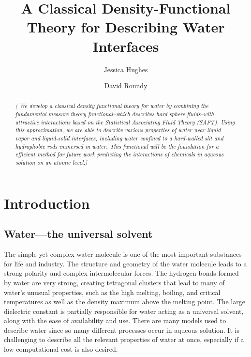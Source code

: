 \documentclass[letterpaper,twocolumn,amsmath,amssymb,prb]{revtex4-1}
\newcommand{\needsworklater}[1]{\emph{[#1]}}
\begin{document}
\title{A Classical Density-Functional Theory for Describing Water Interfaces}

\author{Jessica Hughes}

\author{David Roundy}

\begin{abstract}
\needsworklater{ We develop a classical density functional theory for
  water by combining the fundamental-measure theory functional--which
  describes hard sphere fluids--with attractive interactions based on the 
  Statistical Associating Fluid Theory (SAFT).  Using
  this approximation, we are able to describe various properties of
  water near liquid-vapor and liquid-solid interfaces, including water confined 
  to a hard-walled slit and hydrophobic rods immersed in water.  This
functional 
  will be the foundation for a efficient method for future work
  predicting the interactions of chemicals in aqueous solution on an
  atomic level.}

\tableofcontents
\end{abstract}

\maketitle

\section{Introduction}

\subsection{Water---the universal solvent}

The simple yet complex water molecule is one of the most important 
substances for life and industry. The structure and geometry of the 
water molecule leads to a strong polarity and complex intermolecular
forces. The hydrogen bonds formed by water are very strong, creating
tetragonal clusters that lead to many of water's unusual properties,
such as the high melting, boiling, and critical temperatures as well as the
density maximum above the melting point.
The large dielectric constant is partially responsible for
water acting as a universal solvent, along with the ease of availability and
use.
There are many models used to describe water since so many different
processes occur in aqueous solution. It is challenging to describe all the 
relevant properties of water at once, especially if a low computational cost is
also desired.
\end{document}
